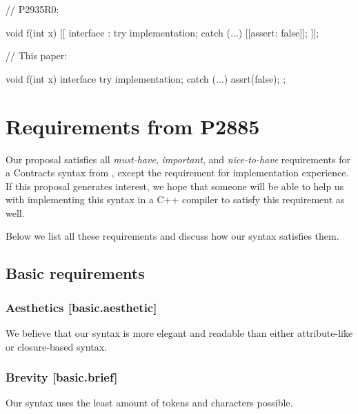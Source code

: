 \begin{minipage}{8cm}
\begin{codeblock}
// P2935R0:

void f(int x)
  [[ interface :
    try {
      implementation;
    } 
    catch (...) {
      [[assert: false]];
    }
  ]];
\end{codeblock}
\end{minipage}
\begin{minipage}{8cm}
\begin{codeblock}
// This paper:

void f(int x)
interface {
  try {
    implementation;
  } 
  catch (...) {
    assrt(false);
  }
};
\end{codeblock}
\end{minipage}

\section{Requirements from P2885}
\label{sec:requirements}

Our proposal satisfies all \emph{must-have}, \emph{important}, and \emph{nice-to-have} requirements for a Contracts syntax from \cite{P2885R2}, except the requirement for implementation experience. If this proposal generates interest, we hope that someone will be able to help us with implementing this syntax in a C++ compiler to satisfy this requirement as well.

Below we list all these requirements and discuss how our syntax satisfies them.

\subsection{Basic requirements}

\subsubsection{Aesthetics  [basic.aesthetic]}

We believe that our syntax is more elegant and readable than either attribute-like or closure-based syntax.

\subsubsection{Brevity  [basic.brief]}

Our syntax uses the least amount of tokens and characters possible.


